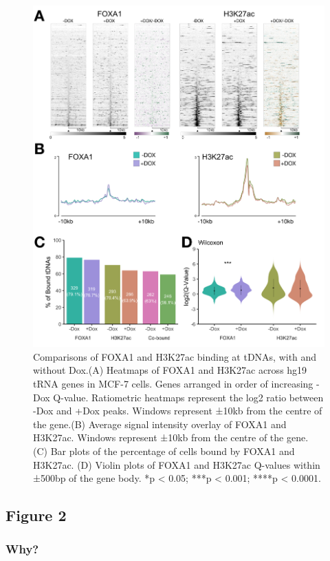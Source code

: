\documentclass[
  11pt,
]{article}
\begin{document}
\begin{figure}[H]
\includegraphics[width=1\linewidth]{../images/results-01} \caption{Comparisons of FOXA1 and H3K27ac binding at tDNAs, with and without Dox.(A) Heatmaps of FOXA1 and H3K27ac across hg19 tRNA genes in MCF-7 cells. Genes arranged in order of increasing -Dox Q-value. Ratiometric heatmaps represent the log2 ratio between -Dox and +Dox peaks. Windows represent ±10kb from the centre of the gene.(B) Average signal intensity overlay of FOXA1 and H3K27ac. Windows represent ±10kb from the centre of the gene. (C) Bar plots of the percentage of cells bound by FOXA1 and H3K27ac. (D) Violin plots of FOXA1 and H3K27ac Q-values within ±500bp of the gene body. *p < 0.05; ***p < 0.001; ****p < 0.0001.}\label{fig:results-1}
\end{figure}

\hypertarget{figure-2}{%
\subsection{Figure 2}\label{figure-2}}

\hypertarget{why}{%
\subsubsection{Why?}\label{why}}
\end{document}
